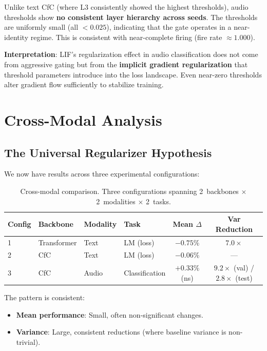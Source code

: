 \documentclass[11pt]{article}
\begin{document}
Unlike text CfC (where L3 consistently showed the highest thresholds), audio thresholds show \textbf{no consistent layer hierarchy across seeds}. The thresholds are uniformly small (all $< 0.025$), indicating that the gate operates in a near-identity regime. This is consistent with near-complete firing (fire rate $\approx 1.000$).

\textbf{Interpretation}: LIF's regularization effect in audio classification does not come from aggressive gating but from the \textbf{implicit gradient regularization} that threshold parameters introduce into the loss landscape. Even near-zero thresholds alter gradient flow sufficiently to stabilize training.


\section{Cross-Modal Analysis}

\subsection{The Universal Regularizer Hypothesis}

We now have results across three experimental configurations:

\begin{table}[h]
\centering
\caption{Cross-modal comparison. Three configurations spanning 2~backbones $\times$ 2~modalities $\times$ 2~tasks.}
\label{tab:cross-modal}
\begin{tabular}{llllcc}
\toprule
\textbf{Config} & \textbf{Backbone} & \textbf{Modality} & \textbf{Task} & \textbf{Mean $\Delta$} & \textbf{Var Reduction} \\
\midrule
1 & Transformer & Text & LM (loss) & $-0.75\%$ & $7.0\times$ \\
2 & CfC & Text & LM (loss) & $-0.06\%$ & --- \\
3 & CfC & Audio & Classification & $+0.33\%$ (ns) & $9.2\times$ (val) / $2.8\times$ (test) \\
\bottomrule
\end{tabular}
\end{table}

The pattern is consistent:
\begin{itemize}
    \item \textbf{Mean performance}: Small, often non-significant changes.
    \item \textbf{Variance}: Large, consistent reductions (where baseline variance is non-trivial).
\end{itemize}
\end{document}
